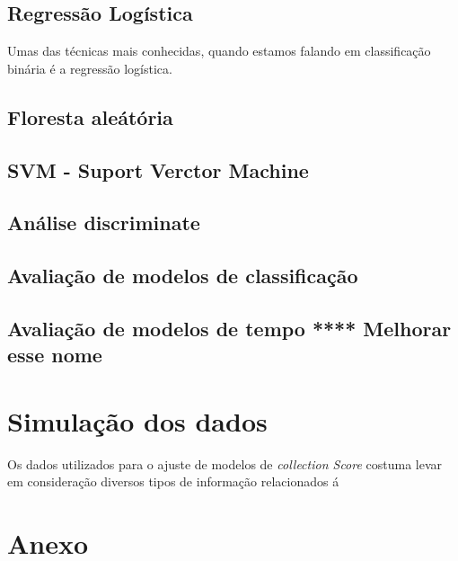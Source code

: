 \documentclass[12pt,a4paper]{article}
\begin{document}
\subsection{Regressão Logística}

Umas das técnicas mais conhecidas, quando estamos falando em classificação binária é a regressão logística.

\subsection{Floresta aleátória}
\subsection{SVM - Suport Verctor Machine}
\subsection{Análise discriminate}


\subsection{Avaliação de modelos de classificação}
\subsection{Avaliação de modelos de tempo **** Melhorar esse nome}
   

\section{Simulação dos dados} %

  Os dados utilizados para o ajuste de modelos de \emph{collection Score} costuma levar em consideração diversos tipos de informação relacionados á 



\newpage %


  



\appendix{}

\section{Anexo}
\end{document}
